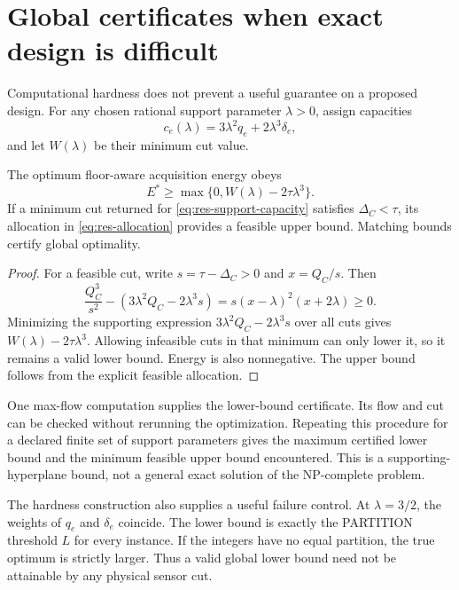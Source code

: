 \section{Global certificates when exact design is difficult}

Computational hardness does not prevent a useful guarantee on a proposed
design. For any chosen rational support parameter $\lambda>0$, assign capacities
\begin{equation}
 c_e(\lambda)=3\lambda^2q_e+2\lambda^3\delta_e,
 \label{eq:res-support-capacity}
\end{equation}
and let $W(\lambda)$ be their minimum cut value.

\begin{proposition}
\label{prop:res-support}
The optimum floor-aware acquisition energy obeys
\begin{equation}
 E^*\geq\max\{0,W(\lambda)-2\tau\lambda^3\}.
 \label{eq:res-support-bound}
\end{equation}
If a minimum cut returned for \eqref{eq:res-support-capacity} satisfies
$\Delta_C<\tau$, its allocation in \eqref{eq:res-allocation} provides a feasible
upper bound. Matching bounds certify global optimality.
\end{proposition}

\begin{proof}
For a feasible cut, write $s=\tau-\Delta_C>0$ and $x=Q_C/s$. Then
\[
 \frac{Q_C^3}{s^2}
 -\left(3\lambda^2Q_C-2\lambda^3s\right)
 =s(x-\lambda)^2(x+2\lambda)\geq0.
\]
Minimizing the supporting expression $3\lambda^2Q_C-2\lambda^3s$ over all cuts gives
$W(\lambda)-2\tau\lambda^3$. Allowing infeasible cuts in that minimum can
only lower it, so it remains a valid lower bound. Energy is also nonnegative.
The upper bound follows from the explicit feasible allocation.
\end{proof}

One max-flow computation supplies the lower-bound certificate. Its flow and
cut can be checked without rerunning the optimization. Repeating this procedure
for a declared finite set of support parameters gives the maximum certified
lower bound and the minimum feasible upper bound encountered. This is a
supporting-hyperplane bound, not a general exact solution of the NP-complete
problem.

The hardness construction also supplies a useful failure control. At
$\lambda=3/2$, the weights of $q_e$ and $\delta_e$ coincide. The lower bound is
exactly the PARTITION threshold $L$ for every instance. If the integers have no
equal partition, the true optimum is strictly larger. Thus a valid global
lower bound need not be attainable by any physical sensor cut.

